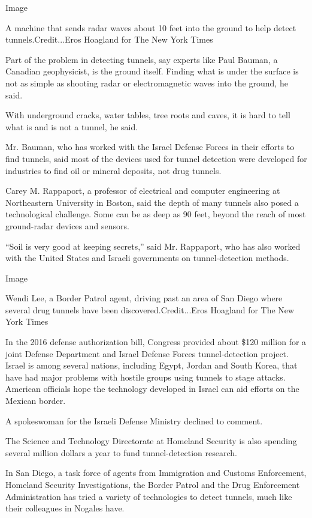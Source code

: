 Image

A machine that sends radar waves about 10 feet into the ground to help
detect tunnels.Credit...Eros Hoagland for The New York Times

Part of the problem in detecting tunnels, say experts like Paul Bauman,
a Canadian geophysicist, is the ground itself. Finding what is under the
surface is not as simple as shooting radar or electromagnetic waves into
the ground, he said.

With underground cracks, water tables, tree roots and caves, it is hard
to tell what is and is not a tunnel, he said.

Mr. Bauman, who has worked with the Israel Defense Forces in their
efforts to find tunnels, said most of the devices used for tunnel
detection were developed for industries to find oil or mineral deposits,
not drug tunnels.

Carey M. Rappaport, a professor of electrical and computer engineering
at Northeastern University in Boston, said the depth of many tunnels
also posed a technological challenge. Some can be as deep as 90 feet,
beyond the reach of most ground-radar devices and sensors.

``Soil is very good at keeping secrets,'' said Mr. Rappaport, who has
also worked with the United States and Israeli governments on
tunnel-detection methods.

Image

Wendi Lee, a Border Patrol agent, driving past an area of San Diego
where several drug tunnels have been discovered.Credit...Eros Hoagland
for The New York Times

In the 2016 defense authorization bill, Congress provided about \$120
million for a joint Defense Department and Israel Defense Forces
tunnel-detection project. Israel is among several nations, including
Egypt, Jordan and South Korea, that have had major problems with hostile
groups using tunnels to stage attacks. American officials hope the
technology developed in Israel can aid efforts on the Mexican border.

A spokeswoman for the Israeli Defense Ministry declined to comment.

The Science and Technology Directorate at Homeland Security is also
spending several million dollars a year to fund tunnel-detection
research.

In San Diego, a task force of agents from Immigration and Customs
Enforcement, Homeland Security Investigations, the Border Patrol and the
Drug Enforcement Administration has tried a variety of technologies to
detect tunnels, much like their colleagues in Nogales have.

